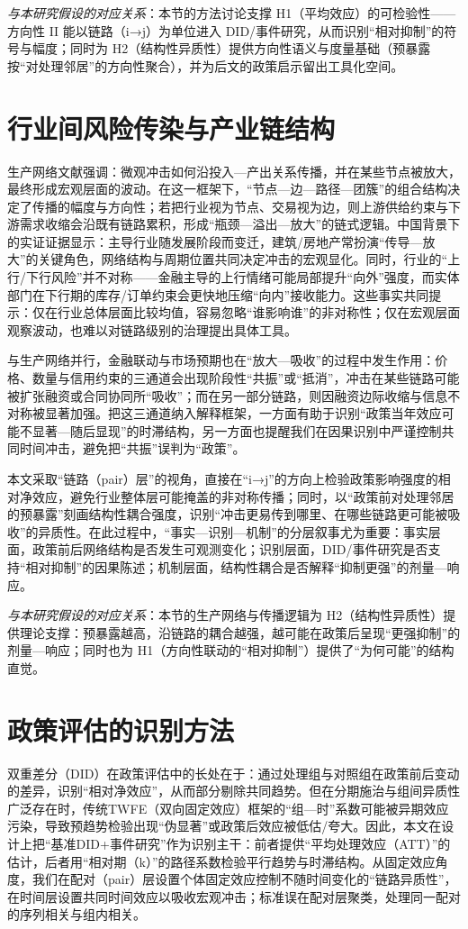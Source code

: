 \noindent\textit{与本研究假设的对应关系}：本节的方法讨论支撑 H1（平均效应）的可检验性——方向性 II 能以链路（i→j）为单位进入 DID/事件研究，从而识别“相对抑制”的符号与幅度；同时为 H2（结构性异质性）提供方向性语义与度量基础（预暴露按“对处理邻居”的方向性聚合），并为后文的政策启示留出工具化空间。
\section{行业间风险传染与产业链结构}
生产网络文献强调：微观冲击如何沿投入—产出关系传播，并在某些节点被放大，最终形成宏观层面的波动\citep{acemoglu2012network,carvalho2014micro}。在这一框架下，“节点—边—路径—团簇”的组合结构决定了传播的幅度与方向性；若把行业视为节点、交易视为边，则上游供给约束与下游需求收缩会沿既有链路累积，形成“瓶颈—溢出—放大”的链式逻辑。中国背景下的实证证据显示：主导行业随发展阶段而变迁，建筑/房地产常扮演“传导—放大”的关键角色，网络结构与周期位置共同决定冲击的宏观显化\citep{huang2024network}。同时，行业的“上行/下行风险”并不对称——金融主导的上行情绪可能局部提升“向外”强度，而实体部门在下行期的库存/订单约束会更快地压缩“向内”接收能力\citep{lizheng2024updown}。这些事实共同提示：仅在行业总体层面比较均值，容易忽略“谁影响谁”的非对称性；仅在宏观层面观察波动，也难以对链路级别的治理提出具体工具。

与生产网络并行，金融联动与市场预期也在“放大—吸收”的过程中发生作用：价格、数量与信用约束的三通道会出现阶段性“共振”或“抵消”，冲击在某些链路可能被扩张融资或合同协同所“吸收”；而在另一部分链路，则因融资边际收缩与信息不对称被显著加强。把这三通道纳入解释框架，一方面有助于识别“政策当年效应可能不显著—随后显现”的时滞结构，另一方面也提醒我们在因果识别中严谨控制共同时间冲击，避免把“共振”误判为“政策”。

本文采取“链路（pair）层”的视角，直接在“i→j”的方向上检验政策影响强度的相对净效应，避免行业整体层可能掩盖的非对称传播；同时，以“政策前对处理邻居的预暴露”刻画结构性耦合强度，识别“冲击更易传到哪里、在哪些链路更可能被吸收”的异质性。在此过程中，“事实—识别—机制”的分层叙事尤为重要：事实层面，政策前后网络结构是否发生可观测变化；识别层面，DID/事件研究是否支持“相对抑制”的因果陈述；机制层面，结构性耦合是否解释“抑制更强”的剂量—响应。

\noindent\textit{与本研究假设的对应关系}：本节的生产网络与传播逻辑为 H2（结构性异质性）提供理论支撑：预暴露越高，沿链路的耦合越强，越可能在政策后呈现“更强抑制”的剂量—响应；同时也为 H1（方向性联动的“相对抑制”）提供了“为何可能”的结构直觉。
\section{政策评估的识别方法}
双重差分（DID）在政策评估中的长处在于：通过处理组与对照组在政策前后变动的差异，识别“相对净效应”，从而部分剔除共同趋势。但在分期施治与组间异质性广泛存在时，传统TWFE（双向固定效应）框架的“组—时”系数可能被异期效应污染，导致预趋势检验出现“伪显著”或政策后效应被低估/夸大\citep{sun2021event}。因此，本文在设计上把“基准DID+事件研究”作为识别主干：前者提供“平均处理效应（ATT）”的估计，后者用“相对期（k）”的路径系数检验平行趋势与时滞结构。从固定效应角度，我们在配对（pair）层设置个体固定效应控制不随时间变化的“链路异质性”，在时间层设置共同时间效应以吸收宏观冲击；标准误在配对层聚类，处理同一配对的序列相关与组内相关\citep{bertrand2004much,cameron2015practitioner}。

